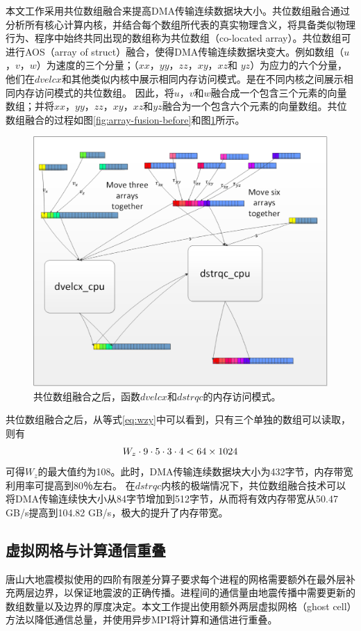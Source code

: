 \documentclass[degree=doctor]{thuthesis}
\begin{document}
本文工作采用共位数组融合来提高DMA传输连续数据块大小。共位数组融合通过分析所有核心计算内核，并结合每个数组所代表的真实物理含义，将具备类似物理行为、程序中始终共同出现的数组称为共位数组（co-located array）。共位数组可进行AOS（array of struct）融合，使得DMA传输连续数据块变大。例如数组（$ u $，$ v $，$ w $）为速度的三个分量；（$ xx $，$ yy $，$ zz $，$ xy $，$ xz $和 $ yz $）为应力的六个分量，他们在$ dvelcx $和其他类似内核中展示相同内存访问模式。是在不同内核之间展示相同内存访问模式的共位数组。 因此，将$ u $，$ v $和$ w $融合成一个包含三个元素的向量数组；并将$ xx $，$ yy $，$ zz $，$ xy $，$ xz $和$ yz $融合为一个包含六个元素的向量数组。共位数组融合的过程如图\ref{fig:array-fusion-before}和图\ref{fig:array-fusion-after}所示。

\begin{figure}[ht]
\centering
\includegraphics[width=0.7\columnwidth]{awp_after.png}
\caption{共位数组融合之后，函数$dvelcx$和$dstrqc$的内存访问模式。}
\label{fig:array-fusion-after}
\end{figure}

共位数组融合之后，从等式\ref{eq:wzy}中可以看到，只有三个单独的数组可以读取，则有
\begin{equation}
W_z \cdot 9 \cdot 5 \cdot 3 \cdot 4 < 64 \times 1024\\
\label{eq:wzy2}
\end{equation}
可得$ W_z $的最大值约为108。此时，DMA传输连续数据块大小为432字节，内存带宽利用率可提高到80％左右。 在$ dstrqc $内核的极端情况下，共位数组融合技术可以将DMA传输连续快大小从84字节增加到512字节，从而将有效内存带宽从50.47 GB/s提高到104.82 GB/s，极大的提升了内存带宽。

\subsection{虚拟网格与计算通信重叠}
\label{sub:虚拟网格与计算通信重叠}
唐山大地震模拟使用的四阶有限差分算子要求每个进程的网格需要额外在最外层补充两层边界，以保证地震波的正确传播。进程间的通信量由地震传播中需要更新的数组数量以及边界的厚度决定。本文工作提出使用额外两层虚拟网格（ghost cell）方法以降低通信总量，并使用异步MPI将计算和通信进行重叠。
\end{document}
